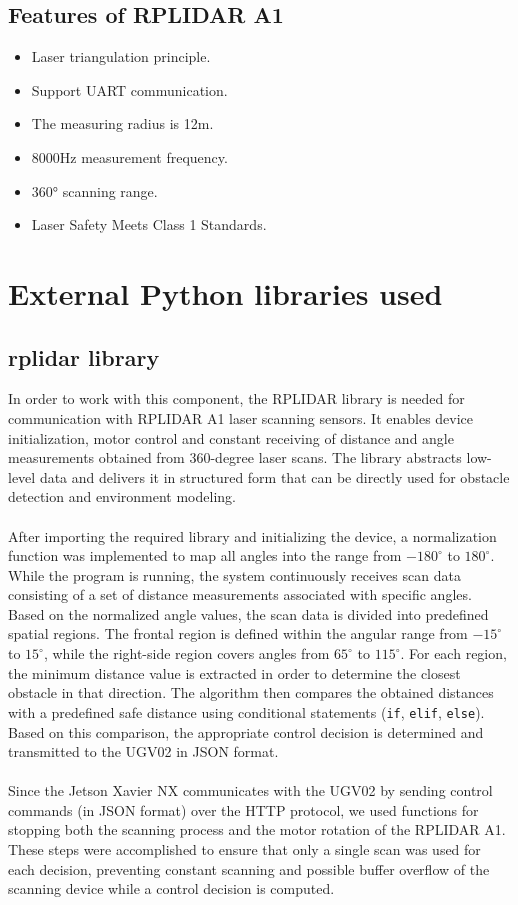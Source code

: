 \documentclass[]{IEEEphot}
\begin{document}
\subsection{Features of RPLIDAR A1}

\begin{itemize}
    \item Laser triangulation principle.
    \item Support UART communication.
    \item The measuring radius is 12m.
    \item 8000Hz measurement frequency.
    \item 360° scanning range.
    \item Laser Safety Meets Class 1 Standards.
\end{itemize}

\section{External Python libraries used}

\subsection{rplidar library}

In order to work with this component, the RPLIDAR library is needed for communication with RPLIDAR A1 laser scanning sensors. It enables device initialization, motor control and constant receiving of distance and angle measurements obtained from 360-degree laser scans. The library abstracts low-level data and delivers it in structured form that can be directly used for obstacle detection and environment modeling.
\\\\
After importing the required library and initializing the device, a normalization function was implemented to map all angles into the range from $-180^\circ$ to $180^\circ$. While the program is running, the system continuously receives scan data consisting of a set of distance measurements associated with specific angles.
Based on the normalized angle values, the scan data is divided into predefined spatial regions. The frontal region is defined within the angular range from $-15^\circ$ to $15^\circ$, while the right-side region covers angles from $65^\circ$ to $115^\circ$. For each region, the minimum distance value is extracted in order to determine the closest obstacle in that direction. The algorithm then compares the obtained distances with a predefined safe distance using conditional statements (\texttt{if}, \texttt{elif}, \texttt{else}). Based on this comparison, the appropriate control decision is determined and transmitted to the UGV02 in JSON format.
\\\\
Since the Jetson Xavier NX communicates with the UGV02 by sending control commands (in JSON format) over the HTTP protocol, we used functions for stopping both the scanning process and the motor rotation of the RPLIDAR A1. These steps were accomplished to ensure that only a single scan was used for each decision, preventing constant scanning and possible buffer overflow of the scanning device while a control decision is computed.
\end{document}
